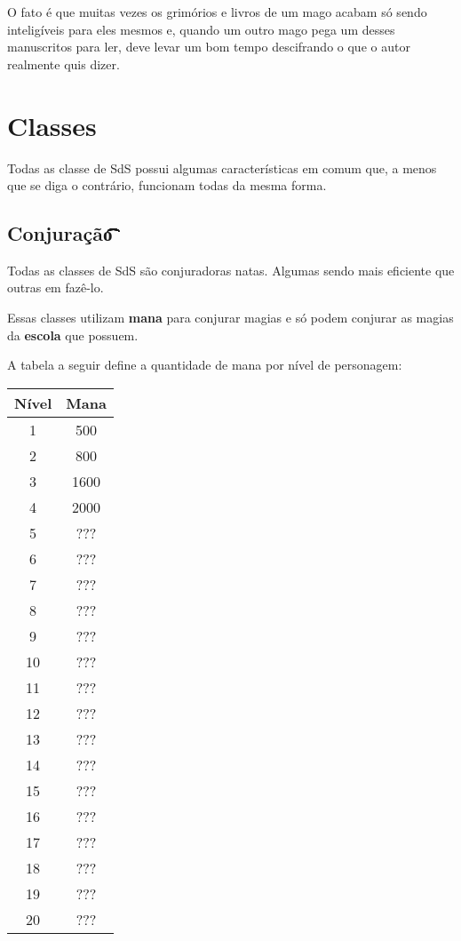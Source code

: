 \documentclass{RPG_Adventure}[2021/10/20]
\begin{document}
O fato é que muitas vezes os grimórios e livros de um mago acabam só sendo
inteligíveis para eles mesmos e, quando um outro mago pega um desses manuscritos
para ler, deve levar um bom tempo descifrando o que o autor realmente quis
dizer.



\chapter{Classes}%
\label{cha:classe}

Todas as classe de SdS possui algumas características em comum que, a menos que
se diga o contrário, funcionam todas da mesma forma.

\section*{Conjuração\t\t\t\t\t\t\t\t\t\t\t}%
\label{sec:conjuracao}

Todas as classes de SdS são conjuradoras natas. Algumas sendo mais eficiente que
outras em fazê-lo.

Essas classes utilizam \textbf{mana} para conjurar magias e só podem conjurar as
magias da \textbf{escola} que possuem.

A tabela a seguir define a quantidade de mana por nível de personagem:

\begin{center}
\begin{tabular}{|||c||c|||}
    \hline
    \textbf{Nível} & \textbf{Mana} \\
    \hline
    \hline
    1 & 500 \\
    \hline
    2 & 800 \\
    \hline
    3 & 1600 \\
    \hline
    4 & 2000 \\
    \hline
    5 & ??? \\
    \hline
    6 & ??? \\
    \hline
    7 & ??? \\
    \hline
    8 & ??? \\
    \hline
    9 & ??? \\
    \hline
    10 & ??? \\
    \hline
    11 & ??? \\
    \hline
    12 & ??? \\
    \hline
    13 & ??? \\
    \hline
    14 & ??? \\
    \hline
    15 & ??? \\
    \hline
    16 & ??? \\
    \hline
    17 & ??? \\
    \hline
    18 & ??? \\
    \hline
    19 & ??? \\
    \hline
    20 & ??? \\
    \hline
\end{tabular}
\end{center}
\end{document}
